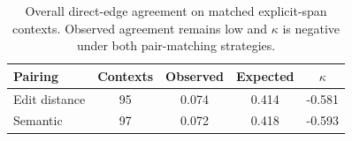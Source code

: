 \begin{table}[t]
\centering
\small
\begin{tabular}{lcccc}
\toprule
Pairing & Contexts & Observed & Expected & $\kappa$ \\
\midrule
Edit distance & 95 & 0.074 & 0.414 & -0.581 \\
Semantic & 97 & 0.072 & 0.418 & -0.593 \\
\bottomrule
\end{tabular}
\caption{Overall direct-edge agreement on matched explicit-span contexts. Observed agreement remains low and $\kappa$ is negative under both pair-matching strategies.}
\label{tab:iaa_edge_summary}
\end{table}
